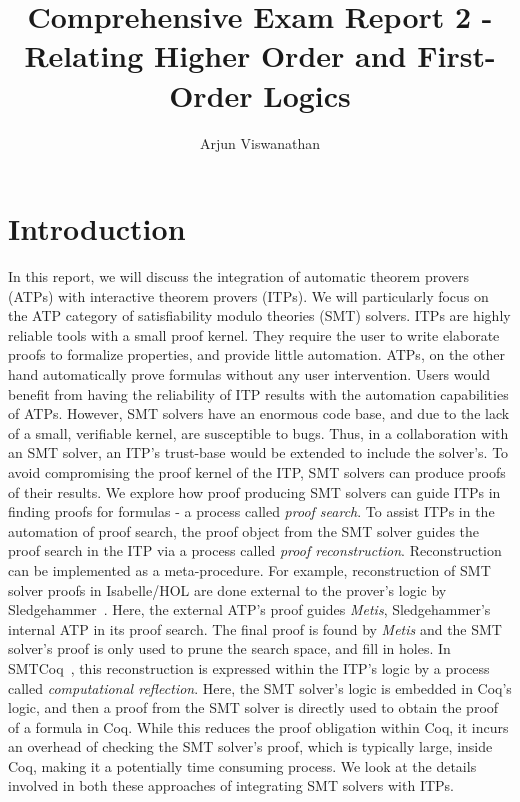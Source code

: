 \documentclass[11pt]{article}
\begin{document}
	\title{Comprehensive Exam Report 2 - Relating Higher Order and First-Order Logics}
	\author{Arjun Viswanathan}
	\date{}
	\maketitle
	
	\section{Introduction}
	\label{sec:intro}
	In this report, we will discuss the 
	integration of automatic theorem provers 
	(ATPs) with interactive theorem 
	provers (ITPs). We will particularly
	focus on the ATP category of 
	satisfiability modulo theories (SMT) 
	solvers. ITPs are highly 
	reliable tools with a small proof kernel. 
	They require the user to write elaborate 
	proofs to formalize properties, and 
	provide little automation. ATPs, on the 
	other hand automatically prove formulas
	without any user intervention.  
	Users would benefit from having 
	the reliability of ITP results 
	with the automation capabilities
	of ATPs. However, SMT solvers have an 
	enormous code base, and due to the 
	lack of a small, verifiable kernel, 
	are susceptible to bugs. Thus, in a 
	collaboration with an SMT 
	solver, an ITP's trust-base would be 
	extended to include the solver's. To 
	avoid compromising the proof kernel of 
	the ITP, SMT solvers can 
	produce proofs of their results. 
	We explore how proof producing 
	SMT solvers can guide ITPs in 
	finding proofs for formulas - 
	a process called \textit{proof 
	search}. To assist ITPs in the 
	automation
	of proof search, the proof object from 
	the SMT solver guides the proof search 
	in the ITP via a process called
	\textit{proof reconstruction}.
	Reconstruction can be implemented 
	as a meta-procedure. For example, 
	reconstruction of SMT solver proofs 
	in Isabelle/HOL are done external to 
	the prover's logic by 
	Sledgehammer~\cite{bohme}.
	Here, the external ATP's proof guides 
	\textit{Metis}, Sledgehammer's
	internal ATP in its proof search.
	The final proof is found by 
	\textit{Metis} and the SMT solver's 
	proof is only used to prune the 
	search space, and fill in holes.
	In SMTCoq~\cite{DBLP:phd/hal/Keller13},
	this reconstruction is 
	expressed within the ITP's logic 
	by a process called 
	\textit{computational reflection}.
	Here, the SMT solver's logic is 
	embedded in Coq's logic, and then 
	a proof from the SMT solver is 
	directly used to obtain the 
	proof of a formula in Coq. 
	While this reduces the 
	proof obligation within Coq, it incurs
	an overhead of checking the SMT 
	solver's proof, which is typically 
	large, inside Coq, making it a
	potentially time consuming process. 
	We look at the details involved in both 
	these approaches of integrating 
	SMT solvers with ITPs.
	
\end{document}
